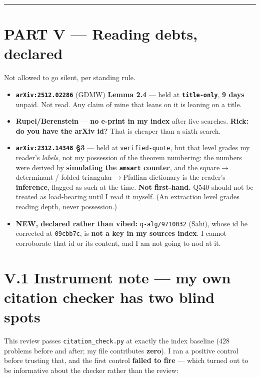 \documentclass[11pt,a4paper]{article}
\begin{document}
\medskip\hrule\medskip

\section*{PART V --- Reading debts, declared}

Not allowed to go silent, per standing rule.

\begin{itemize}
\item \textbf{\mbox{\texttt{arXiv:2512.02286}}} (GDMW) \textbf{Lemma 2.4} --- held at \textbf{\mbox{\texttt{title-only}}}, \textbf{9 days} unpaid. Not read. Any claim of mine that leans on it is leaning on a title.
\item \textbf{Rupel/Berenstein} --- \textbf{no e-print in my index} after five searches. \textbf{Rick: do you have the arXiv id?} That is cheaper than a sixth search.
\item \textbf{\mbox{\texttt{arXiv:2312.14348}} \S{}3} --- held at \mbox{\texttt{verified-quote}}, but that level grades my reader's \emph{labels}, not my possession of the theorem numbering: the numbers were derived by \textbf{simulating the \mbox{\texttt{amsart}} counter}, and the square$\to$determinant / folded-triangular$\to$Pfaffian dictionary is the reader's \textbf{inference}, flagged as such at the time. \textbf{Not first-hand.} Q540 should not be treated as load-bearing until I read it myself. (An extraction level grades reading depth, never possession.)
\item \textbf{NEW, declared rather than vibed:} \mbox{\texttt{q-alg/9710032}} (Sahi), whose id he corrected at \mbox{\texttt{09cbb7c}}, is \textbf{not a key in my sources index}. I cannot corroborate that id or its content, and I am not going to nod at it.
\end{itemize}

\section*{V.1 Instrument note --- my own citation checker has two blind spots}

This review passes \mbox{\texttt{citation\_check.py}} at exactly the index baseline (428 problems before and after; my file contributes \textbf{zero}). I ran a positive control before trusting that, and the first control \textbf{failed to fire} --- which turned out to be informative about the checker rather than the review:
\end{document}
